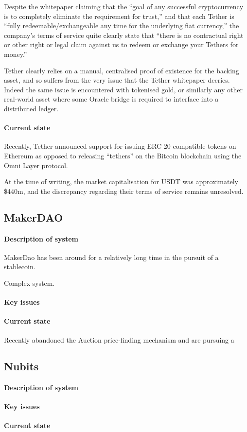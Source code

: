 Despite the whitepaper claiming that the ``goal of any successful cryptocurrency is to completely eliminate the requirement for trust,'' and that each Tether is ``fully redeemable/exchangeable any time for the underlying fiat currency,'' the company's terms of service quite clearly state that ``there is no contractual right or other right or legal claim against us to redeem or exchange your Tethers for money.''

Tether clearly relies on a manual, centralised proof of existence for the backing asset, and so suffers from the very issue that the Tether whitepaper decries. Indeed the same issue is encountered with tokenised gold, or similarly any other real-world asset where some Oracle bridge is required to interface into a distributed ledger.

\paragraph{Current state}

Recently, Tether announced support for issuing ERC-20 compatible tokens on Ethereum as opposed to releasing ``tethers'' on the Bitcoin blockchain using the Omni Layer protocol.

At the time of writing, the market capitalisation for USDT was approximately \$440m, and the discrepancy regarding their terms of service remains unresolved.


\subsection{MakerDAO}

\paragraph{Description of system}

MakerDao has been around for a relatively long time in the pursuit of a stablecoin.

Complex system.

\paragraph{Key issues}

\paragraph{Current state}

Recently abandoned the Auction price-finding mechanism and are pursuing a 


\subsection{Nubits}

\paragraph{Description of system}

\paragraph{Key issues}

\paragraph{Current state}

\pagebreak